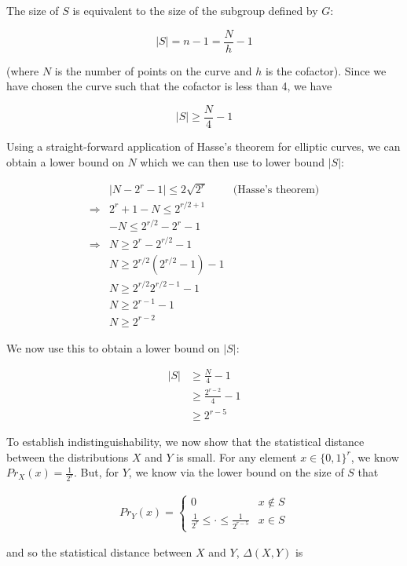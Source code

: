 \documentclass{article}
\begin{document}
The size of $S$ is equivalent to the size of the subgroup defined by $G$:

\[ \lvert S \rvert = n - 1 = \frac{N}{h} - 1 \]

\noindent (where $N$ is the number of points on the curve and $h$ is the cofactor).  
Since we have chosen the curve such that the cofactor is less than 4, we have 

\[ \lvert S \rvert \geq \frac{N}{4} - 1 \]

\noindent Using a straight-forward application of Hasse's theorem for elliptic curves, 
we can obtain a lower bound on $N$ which we can then use to lower bound $\lvert S \rvert$:

\begin{align*}
&\lvert N - 2^r - 1 \rvert \leq 2 \sqrt{2^r} & \text{(Hasse's theorem)} \\
\Rightarrow& 2^r + 1 - N \leq 2^{r/2 + 1} \\
& -N \leq 2^{r/2} - 2^r - 1 \\
\Rightarrow& N \geq 2^r-2^{r/2}-1 \\
& N \geq 2^{r/2}(2^{r/2}-1) - 1 \\
& N \geq 2^{r/2}2^{r/2-1} - 1 \\
& N \geq 2^{r-1} - 1\\
& N \geq 2^{r-2} 
\end{align*}

\noindent We now use this to obtain a lower bound on $\lvert S \rvert$:

\begin{align*}
\lvert S \rvert &\geq \frac{N}{4} - 1 \\
&\geq \frac{2^{r-2} }{4} - 1 \\
&\geq 2^{r-5}
\end{align*}

\noindent To establish indistinguishability, we now show that the statistical distance between 
the distributions $X$ and $Y$ is small.  For any element $x \in \{0,1\}^r$, we know 
$Pr_X(x) = \frac{1}{2^r}$.  But, for $Y$, we know via the lower bound on the size of $S$ that

\begin{align*}
Pr_Y(x) = \begin{cases} 
      0 & x \not\in S \\
      \frac{1}{2^r} \leq \cdot \leq \frac{1}{2^{r-5}} & x \in S
   \end{cases}
\end{align*}

\noindent and so the statistical distance between $X$ and $Y$, $\Delta(X,Y)$ is 
\end{document}
